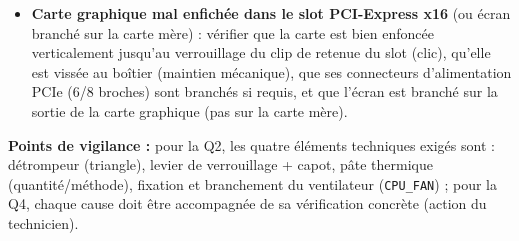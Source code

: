 \documentclass[11pt]{article}
\begin{document}
\begin{corrige}
\begin{enumerate}
\begin{itemize}
    \item \textbf{Carte graphique mal enfichée dans le slot PCI-Express x16} (ou écran branché sur la carte mère) : vérifier que la carte est bien enfoncée verticalement jusqu'au verrouillage du clip de retenue du slot (clic), qu'elle est vissée au boîtier (maintien mécanique), que ses connecteurs d'alimentation PCIe (6/8 broches) sont branchés si requis, et que l'écran est branché sur la sortie de la carte graphique (pas sur la carte mère).
  \end{itemize}
\end{enumerate}
\textbf{Points de vigilance :} pour la Q2, les quatre éléments techniques exigés sont : détrompeur (triangle), levier de verrouillage + capot, pâte thermique (quantité/méthode), fixation et branchement du ventilateur (\texttt{CPU\_FAN}) ; pour la Q4, chaque cause doit être accompagnée de sa vérification concrète (action du technicien).
\end{corrige}
\end{document}
